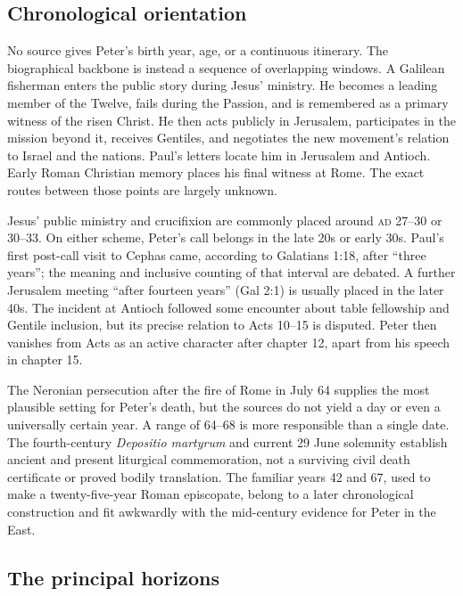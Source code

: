 \subsection{Chronological orientation}\label{sec:peter-orientation}

No source gives Peter's birth year, age, or a continuous itinerary. The
biographical backbone is instead a sequence of overlapping windows. A
Galilean fisherman enters the public story during Jesus' ministry. He becomes
a leading member of the Twelve, fails during the Passion, and is remembered
as a primary witness of the risen Christ. He then acts publicly in Jerusalem,
participates in the mission beyond it, receives Gentiles, and negotiates the
new movement's relation to Israel and the nations. Paul's letters locate him
in Jerusalem and Antioch. Early Roman Christian memory places his final
witness at Rome. The exact routes between those points are largely unknown.

Jesus' public ministry and crucifixion are commonly placed around
\textsc{ad} 27--30 or 30--33. On either scheme, Peter's call belongs in the
late 20s or early 30s. Paul's first post-call visit to Cephas came, according
to Galatians 1:18, after ``three years''; the meaning and inclusive counting
of that interval are debated. A further Jerusalem meeting ``after fourteen
years'' (Gal 2:1) is usually placed in the later 40s. The incident at Antioch
followed some encounter about table fellowship and Gentile inclusion, but its
precise relation to Acts 10--15 is disputed. Peter then vanishes from Acts as
an active character after chapter 12, apart from his speech in chapter 15.

The Neronian persecution after the fire of Rome in July 64 supplies the most
plausible setting for Peter's death, but the sources do not yield a day or
even a universally certain year. A range of 64--68 is more responsible than a
single date. The fourth-century \emph{Depositio martyrum} and current 29 June
solemnity establish ancient and present liturgical commemoration, not a
surviving civil death certificate or proved bodily translation. The familiar years 42
and 67, used to make a twenty-five-year Roman episcopate, belong to a later
chronological construction and fit awkwardly with the mid-century evidence for
Peter in the East.

\subsection{The principal horizons}

